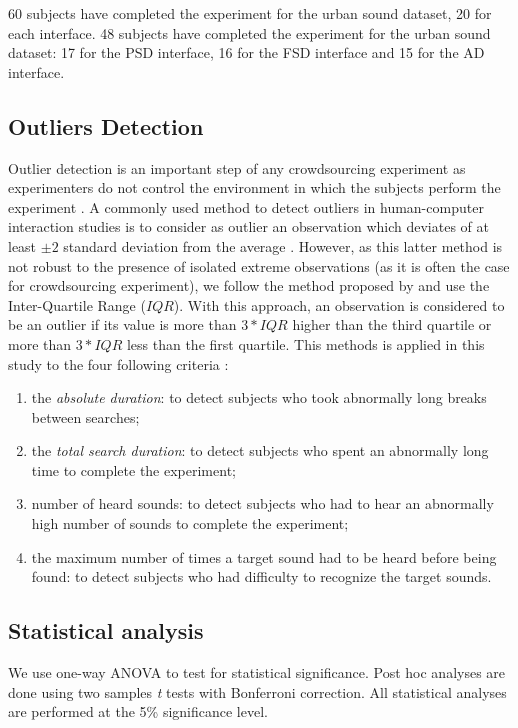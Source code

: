 \documentclass{aes2e}
\begin{document}
60 subjects have completed the experiment for the urban sound dataset, 20 for each interface. 48 subjects have completed the experiment for the urban sound dataset: 17 for the PSD interface, 16 for the FSD interface and 15 for the AD interface.

\subsection{Outliers Detection}

Outlier detection is an important step of any crowdsourcing experiment as experimenters do not control the environment in which the subjects perform the experiment \cite{komarov2013crowdsourcing,buchholz2011crowdsourcing}. A commonly used method to detect outliers in  human-computer interaction studies is to consider as outlier an observation which deviates of at least $\pm2$ standard deviation from the average \cite{komarov2013crowdsourcing}. However, as this latter method is not robust to the presence of isolated extreme observations (as it is often the case for crowdsourcing experiment), we follow the  method proposed by \cite{komarov2013crowdsourcing} and use the Inter-Quartile Range ($IQR$). With this approach, an observation is considered to be an outlier if its value is more than $3*IQR$ higher than the third quartile or more than $3*IQR$ less than the first quartile. This methods is applied in this study to the four following criteria :

\begin{enumerate}
\item the \textit{absolute duration}: to detect subjects who took abnormally long breaks between searches;
\item the \textit{total search duration}: to detect subjects who spent an abnormally long time to complete the experiment;
\item number of heard sounds: to detect subjects who had to hear an abnormally high number of sounds to complete the experiment;
\item the maximum number of times a target sound had to be heard before being found: to detect subjects who had difficulty to recognize the target sounds.
\end{enumerate}

\subsection{Statistical analysis}

We use one-way ANOVA to test for statistical significance. Post hoc analyses are done using two samples \textit{t} tests with Bonferroni correction. All statistical analyses are performed at the 5\% significance level.
\end{document}
